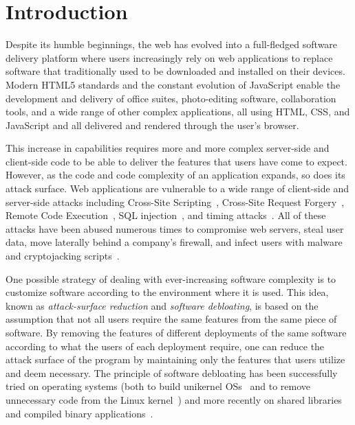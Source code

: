 \section{Introduction}


Despite its humble beginnings, the web has evolved into a full-fledged
software delivery platform where users increasingly rely on web applications
to replace software that traditionally used to be downloaded and installed on
their devices. Modern HTML5 standards and the constant evolution of JavaScript
enable the development and delivery of office suites, photo-editing software,
collaboration tools, and a wide range of other complex applications, all
using HTML, CSS, and JavaScript and all delivered and rendered through the
user's browser.


This increase in capabilities requires more and more complex server-side
and client-side code to be able to deliver the features that users have
come to expect. However, as the code and code complexity of an application
expands, so does its attack surface. Web applications are vulnerable to
a wide range of client-side and server-side attacks including Cross-Site
Scripting~\cite{xss,kirda2006noxes,vogt2007cross}, Cross-Site
Request Forgery~\cite{csrf,jovanovic2006preventing,barth2008csrf},
Remote Code Execution~\cite{rce}, SQL
injection~\cite{sqlInjection,halfond2006classification}, and timing
attacks~\cite{brumley2003timing,vangoethem2015timing}. All of these
attacks have
been abused numerous times to compromise web servers, steal user data,
move laterally behind a company's firewall, and infect users with malware
and cryptojacking scripts~\cite{minesweeper-ccs2018, wang2018seismic,
cryptojacking-ccs2018}.

One possible strategy of dealing with ever-increasing software complexity is to
customize software according to the environment where it is used. This idea,
known as \textit{attack-surface reduction} and \textit{software debloating},
is based on the assumption that not all users require the same features from
the same piece of software. By removing the features of different deployments
of the same software according to what the users of each deployment require,
one can reduce the attack surface of the program by maintaining only the
features that users utilize and deem necessary. The principle of software
debloating has been successfully tried on operating systems (both to build
unikernel OSs~\cite{madhavapeddy2013unikernels} and to remove
unnecessary code from the Linux kernel~\cite{kurmus2013attack,
Kurmus:2011:ASR:1972551.1972557}) and more recently on shared
libraries~\cite{mishra2018shredder,quach2018debloating} and compiled binary
applications~\cite{heo2018effective}.

